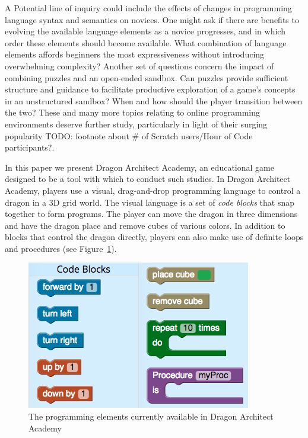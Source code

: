 \documentclass{sig-alternate}
\newcommand{\TODO}[1]{{\color{red} TODO: #1}}
\newcommand{\gametitle}{{\color{RoyalPurple} Dragon Architect Academy}}
\begin{document}
A Potential line of inquiry could include the effects of changes in programming language syntax and semantics on novices. One might ask if there are benefits to evolving the available language elements as a novice progresses, and in which order these elements should become available. What combination of language elements affords beginners the most expressiveness without introducing overwhelming complexity? Another set of questions concern the impact of combining puzzles and an open-ended sandbox. Can puzzles provide sufficient structure and guidance to facilitate productive exploration of a game's concepts in an unstructured sandbox? When and how should the player transition between the two? These and many more topics relating to online programming environments deserve further study, particularly in light of their surging popularity \TODO{footnote about \# of Scratch users/Hour of Code participants?}. 

In this paper we present \gametitle{}, an educational game designed to be a tool with which to conduct such studies. In \gametitle{}, players use a visual, drag-and-drop programming language to control a dragon in a 3D grid world. The visual language is a set of \emph{code blocks} that snap together to form programs. The player can move the dragon in three dimensions and have the dragon place and remove cubes of various colors. In addition to blocks that control the dragon directly, players can also make use of definite loops and procedures (see Figure~\ref{fig:toolbox}).

\begin{figure}[ht]
  \centering
  \includegraphics[width=\columnwidth]{images/toolbox_wide}
  \caption{The programming elements currently available in \gametitle{}}
  \label{fig:toolbox}
\end{figure}
\end{document}
